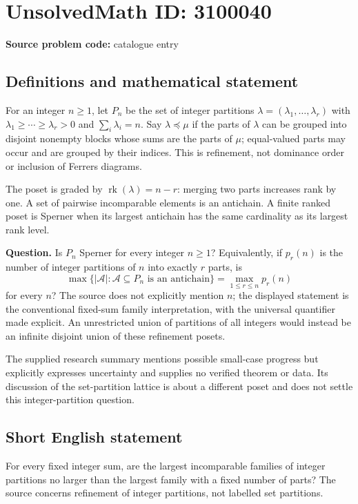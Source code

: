 \documentclass[11pt]{article}
\begin{document}
\section*{UnsolvedMath ID: 3100040}
\textbf{Source problem code:} catalogue entry
\subsection{Definitions and mathematical statement}
For an integer $n\geq1$, let $P_n$ be the set of integer partitions $\lambda=(\lambda_1,\ldots,\lambda_r)$ with $\lambda_1\geq\cdots\geq\lambda_r>0$ and $\sum_i\lambda_i=n$. Say $\lambda\preceq\mu$ if the parts of $\lambda$ can be grouped into disjoint nonempty blocks whose sums are the parts of $\mu$; equal-valued parts may occur and are grouped by their indices. This is refinement, not dominance order or inclusion of Ferrers diagrams.

The poset is graded by $\operatorname{rk}(\lambda)=n-r$: merging two parts increases rank by one. A set of pairwise incomparable elements is an antichain. A finite ranked poset is Sperner when its largest antichain has the same cardinality as its largest rank level.

\textbf{Question.} Is $P_n$ Sperner for every integer $n\geq1$? Equivalently, if $p_r(n)$ is the number of integer partitions of $n$ into exactly $r$ parts, is
\[
\max\{|\mathcal A|:\mathcal A\subseteq P_n\text{ is an antichain}\}
=\max_{1\leq r\leq n}p_r(n)
\]
for every $n$? The source does not explicitly mention $n$; the displayed statement is the conventional fixed-sum family interpretation, with the universal quantifier made explicit. An unrestricted union of partitions of all integers would instead be an infinite disjoint union of these refinement posets.

The supplied research summary mentions possible small-case progress but explicitly expresses uncertainty and supplies no verified theorem or data. Its discussion of the set-partition lattice is about a different poset and does not settle this integer-partition question.
\subsection{Short English statement}
For every fixed integer sum, are the largest incomparable families of integer partitions no larger than the largest family with a fixed number of parts? The source concerns refinement of integer partitions, not labelled set partitions.
\end{document}
